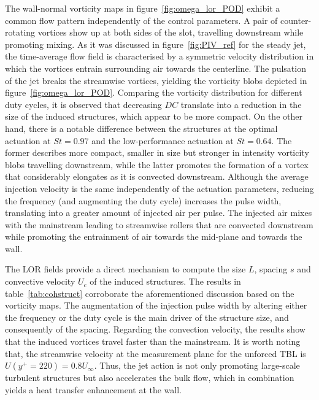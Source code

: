 The wall-normal vorticity maps in figure~\ref{fig:omega_lor_POD} exhibit a common flow pattern independently of the control parameters. A pair of counter-rotating vortices show up at both sides of the slot, travelling downstream while promoting mixing. As it was discussed in figure~\ref{fig:PIV_ref} for the steady jet, the time-average flow field is characterised by a symmetric velocity distribution in which the vortices entrain surrounding air towards the centerline. The pulsation of the jet breaks the streamwise vortices, yielding the vorticity blobs depicted in figure~\ref{fig:omega_lor_POD}. Comparing the vorticity distribution for different duty cycles, it is observed that decreasing $DC$ translate into a reduction in the size of the induced structures, which appear to be more compact. On the other hand, there is a notable difference between the structures at the optimal actuation at $St = 0.97$ and the low-performance actuation at $St = 0.64$. The former describes more compact, smaller in size but stronger in intensity vorticity blobs travelling downstream, while the latter promotes the formation of a vortex that considerably elongates as it is convected downstream. Although the average injection velocity is the same independently of the actuation parameters, reducing the frequency (and augmenting the duty cycle) increases the pulse width, translating into a greater amount of injected air per pulse. The injected air mixes with the mainstream leading to streamwise rollers that are convected downstream while promoting the entrainment of air towards the mid-plane and towards the wall.

The LOR fields provide a direct mechanism to compute the size $L$, spacing $s$ and convective velocity $U_c$ of the induced structures. The results in table~\ref{tab:cohstruct} corroborate the aforementioned discussion based on the vorticity maps. The augmentation of the injection pulse width by altering either the frequency or the duty cycle is the main driver of the structure size, and consequently of the spacing. Regarding the convection velocity, the results show that the induced vortices travel faster than the mainstream. It is worth noting that, the streamwise velocity at the measurement plane for the unforced TBL is $U(y^+=220)=0.8U_\infty$. Thus, the jet action is not only promoting large-scale turbulent structures but also accelerates the bulk flow, which in combination yields a heat transfer enhancement at the wall.

